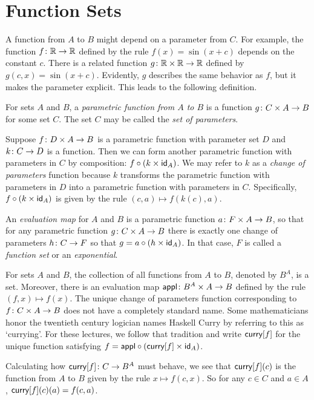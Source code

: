 \section{Function Sets}

A function from $A$ to $B$ might depend on a parameter from $C$. 
For example, the function ${f}\colon{\mathbb R}\to{\mathbb R}$ defined by the rule $f(x) = \sin(x + c)$ depends on the constant $c$.
There is a related function ${g}\colon{\mathbb R\times \mathbb R}\to{\mathbb R}$ defined by $g(c,x) = \sin(x+c)$.
Evidently, $g$ describes the same behavior as $f$, but it makes the parameter explicit.
This leads to the following definition.

\begin{defn}
	For sets $A$ and $B$, a \emph{parametric function from $A$ to $B$} is a function ${g}\colon{C\times A}\to{B}$ for some set $C$.
	The set $C$ may be called the \emph{set of parameters}.
	
	Suppose ${f}\colon{D\times A}\to{B}$ is a parametric function with parameter set $D$ and ${k}\colon{C}\to{D}$ is a function.
	Then we can form another parametric function with parameters in $C$ by composition: $f\circ (k\times \textsf{id}_A)$.
	We may refer to $k$ as a \emph{change of parameters} function because $k$ transforms the parametric function with parameters in $D$ into a parametric function with parameters in $C$. 
	Specifically, $f\circ(k\times \textsf{id}_A)$ is given by the rule $(c,a)\mapsto f(k(c),a)$. 
	
	An \emph{evaluation map} for $A$ and $B$ is a parametric function ${a}\colon{F\times A}\to{B}$, so that for any 
	parametric function ${g}\colon{C\times A}\to{B}$ there is exactly one change of parameters ${h}\colon{C}\to{F}$ so that
	$g = a\circ (h\times \textsf{id}_A)$. In that case, $F$ is called a \emph{function set} or an \emph{exponential}.
\end{defn}

\begin{principle}
	For sets $A$ and $B$, the collection of all functions from $A$ to $B$, denoted by $B^A$, is a set.
	Moreover, there is an evaluation map ${\mathord{\textsf{appl}}}\colon{B^A\times A}\to{B}$ defined by the rule $(f,x) \mapsto f(x)$.
	The unique change of parameters function corresponding to ${f}\colon{C\times A}\to{B}$ does not have a completely standard name.
	Some mathematicians honor the twentieth century logician names Haskell Curry by referring to this as `currying'.
	For these lectures, we follow that tradition and write $\mathord{\textsf{curry}}[f]$ for the unique function satisfying $f = \mathord{\textsf{appl}}\circ (\mathord{\textsf{curry}}[f] \times \textsf{id}_A)$.
	
	Calculating how ${\mathord{\textsf{curry}}[f]}\colon{C}\to{B^A}$ must behave, we see that $\mathord{\textsf{curry}}[f](c)$ is the function from $A$ to $B$ given by the rule $x\mapsto f(c,x)$.
	So for any $c\in C$ and $a\in A$, $\mathord{\textsf{curry}}[f](c)(a) = f(c,a)$. 
\end{principle}

